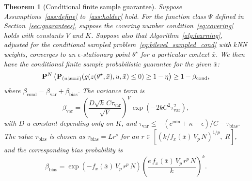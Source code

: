 \documentclass[11pt]{article}
\newtheorem{theorem}{Theorem}[section]
\begin{document}
\begin{theorem}[Conditional finite sample guarantee]
	\label{thm:fin_sample_cond}
Suppose Assumptions~\ref{ass:define} to~\ref{ass:holder} hold.
For the function class $\Psi$ defined in Section~\ref{sec:guarantees}, suppose the covering number condition~\eqref{eq:covering} holds with constants $V$ and $K$.
Suppose also that Algorithm~\ref{alg:learning}, adjusted for the conditional sampled problem~\eqref{eq:bilevel_sampled_cond} with $k$NN weights, converges to an $\epsilon$-stationary point $\theta^\star$ for a particular context $\bar{x}$. We then have the conditional finite sample probabilistic guarantee for the given $\bar{x}$:
\begin{equation}
	\label{eq:prob_guarantee_cond}
	{\mathbf P}^{N}\left ({\mathbf P}_{(u | x = \bar{x})}(g(z(\theta^\star,\bar{x}),u,\bar{x})\leq 0) \geq 1 - \eta \right ) \geq 1 - \beta_{\mathrm{cond}},
\end{equation}
where $\beta_{\mathrm{cond}} = \beta_{\mathrm{var}} + \beta_{\mathrm{bias}}$.
The variance term is
$$\beta_{\mathrm{var}} = \left(\frac{D\sqrt{k}\,C\tau_{\mathrm{var}}}{\sqrt{V}}\right)^V\exp(-2kC^2\tau_{\mathrm{var}}^2),$$
with $D$ a constant depending only on $K$, and $\tau_{\mathrm{var}} \leq -(c^{\min}+\kappa+\epsilon)/C - \tau_{\mathrm{bias}} $.
The value $\tau_{\mathrm{bias}}$ is chosen as $\tau_{\mathrm{bias}}= L r^s$ for an $r \in \left[\left({k/f_x(\bar{x})\, V_p\, N}\right)^{1/p},\; R\right]$, and the corresponding bias probability is
$$\beta_{\mathrm{bias}} = \exp\left(-f_x(\bar{x})\, V_p\, r^p\, N\right)\left(\frac{e\,f_x(\bar{x})\, V_p\, r^p\, N}{k}\right)^k.$$
\end{theorem}
\end{document}
